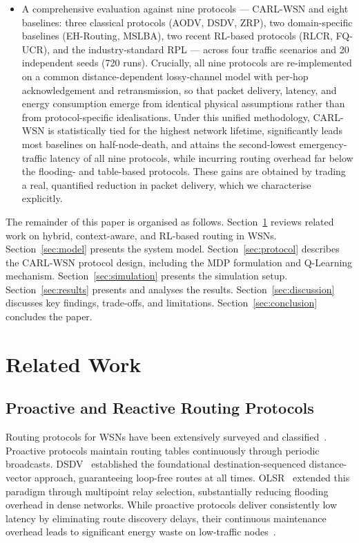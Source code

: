 \documentclass[12pt]{article}
\begin{document}
\begin{itemize}
\item A comprehensive evaluation against nine protocols --- CARL-WSN and eight baselines: three classical protocols (AODV,
DSDV, ZRP), two domain-specific baselines (EH-Routing, MSLBA), two
recent RL-based protocols (RLCR, FQ-UCR), and the industry-standard
RPL --- across four traffic scenarios and 20 independent seeds (720
runs). Crucially, all nine protocols are re-implemented on a common
distance-dependent lossy-channel model with per-hop acknowledgement and retransmission, so that packet delivery, latency, and energy consumption emerge from identical
physical assumptions rather than from protocol-specific idealisations. Under this unified methodology,
CARL-WSN is statistically tied for the highest network lifetime, significantly leads
most baselines on half-node-death, and attains the second-lowest emergency-traffic
latency of all nine protocols, while incurring routing overhead far below the
flooding- and table-based protocols. These gains are obtained by trading a real,
quantified reduction in packet delivery, which we characterise explicitly.
\end{itemize}

The remainder of this paper is organised as follows.
Section~\ref{sec:related} reviews related work on hybrid, context-aware,
and RL-based routing in WSNs. Section~\ref{sec:model} presents the
system model. Section~\ref{sec:protocol} describes the CARL-WSN
protocol design, including the MDP formulation and Q-Learning
mechanism. Section~\ref{sec:simulation} presents the simulation setup.
Section~\ref{sec:results} presents and analyses the results.
Section~\ref{sec:discussion} discusses key findings, trade-offs, and
limitations. Section~\ref{sec:conclusion} concludes the paper.


\section{Related Work}
\label{sec:related}

\subsection{Proactive and Reactive Routing Protocols}

Routing protocols for WSNs have been extensively surveyed and
classified~\cite{akkaya2005}. Proactive protocols maintain routing
tables continuously through periodic broadcasts. DSDV~\cite{perkins1994}
established the foundational destination-sequenced distance-vector
approach, guaranteeing loop-free routes at all times.
OLSR~\cite{clausen2003} extended this paradigm through multipoint relay
selection, substantially reducing flooding overhead in dense networks.
While proactive protocols deliver consistently low latency by
eliminating route discovery delays, their continuous maintenance
overhead leads to significant energy waste on low-traffic
nodes~\cite{akkaya2005}.
\end{document}
